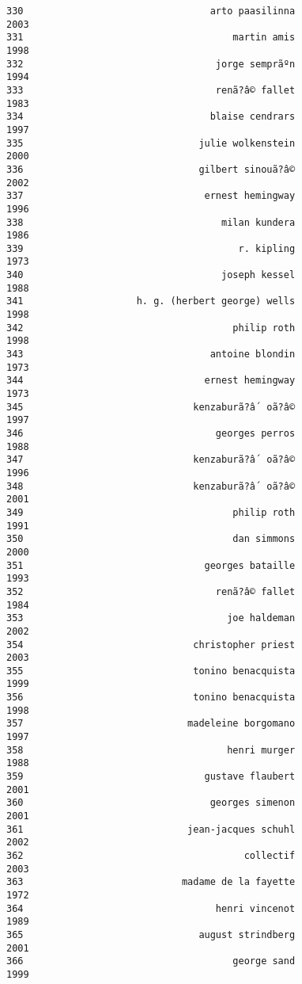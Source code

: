 \documentclass[
]{report}
\begin{document}
\begin{verbatim}
330                                 arto paasilinna                2003
331                                     martin amis                1998
332                                  jorge semprãºn                1994
333                                  renã?â© fallet                1983
334                                 blaise cendrars                1997
335                               julie wolkenstein                2000
336                               gilbert sinouã?â©                2002
337                                ernest hemingway                1996
338                                   milan kundera                1986
339                                      r. kipling                1973
340                                   joseph kessel                1988
341                    h. g. (herbert george) wells                1998
342                                     philip roth                1998
343                                 antoine blondin                1973
344                                ernest hemingway                1973
345                              kenzaburã?â´ oã?â©                1997
346                                  georges perros                1988
347                              kenzaburã?â´ oã?â©                1996
348                              kenzaburã?â´ oã?â©                2001
349                                     philip roth                1991
350                                     dan simmons                2000
351                                georges bataille                1993
352                                  renã?â© fallet                1984
353                                    joe haldeman                2002
354                              christopher priest                2003
355                              tonino benacquista                1999
356                              tonino benacquista                1998
357                             madeleine borgomano                1997
358                                    henri murger                1988
359                                gustave flaubert                2001
360                                 georges simenon                2001
361                             jean-jacques schuhl                2002
362                                       collectif                2003
363                            madame de la fayette                1972
364                                  henri vincenot                1989
365                               august strindberg                2001
366                                     george sand                1999

\end{verbatim}
\end{document}

